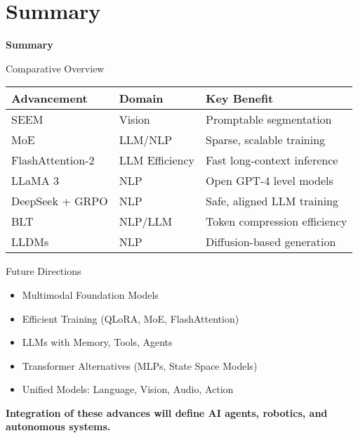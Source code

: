 \section{Summary}
\begin{frame}{}
    \LARGE \textbf{Summary}
\end{frame}

\begin{frame}{Comparative Overview}
    \begin{table}[]
        \centering
        \begin{tabular}{|l|l|p{6cm}|}
            \hline
            \textbf{Advancement} & \textbf{Domain} & \textbf{Key Benefit} \\
            \hline
            SEEM & Vision & Promptable segmentation \\
            MoE & LLM/NLP & Sparse, scalable training \\
            FlashAttention-2 & LLM Efficiency & Fast long-context inference \\
            LLaMA 3 & NLP & Open GPT-4 level models \\
            DeepSeek + GRPO & NLP & Safe, aligned LLM training \\
            BLT & NLP/LLM & Token compression efficiency \\
            LLDMs & NLP & Diffusion-based generation \\
            \hline
        \end{tabular}
    \end{table}
\end{frame}

\begin{frame}{Future Directions}
    \begin{itemize}
        \item Multimodal Foundation Models
        \item Efficient Training (QLoRA, MoE, FlashAttention)
        \item LLMs with Memory, Tools, Agents
        \item Transformer Alternatives (MLPs, State Space Models)
        \item Unified Models: Language, Vision, Audio, Action
    \end{itemize}
    \vspace{0.5cm}
    \textbf{Integration of these advances will define AI agents, robotics, and autonomous systems.}
\end{frame}

